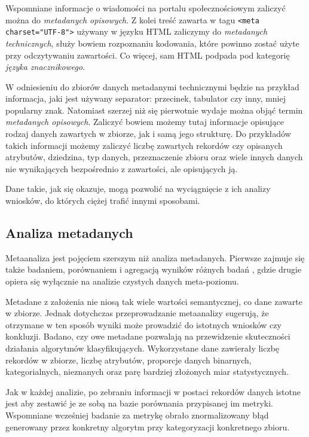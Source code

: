 	Wspomniane informacje o wiadomości na portalu społecznościowym zaliczyć można do \emph{metadanych opisowych}.
	Z kolei treść zawarta w tagu \lstinline{<meta charset="UTF-8">} używany w języku HTML zaliczymy do \emph{metadanych technicznych}, służy bowiem rozpoznaniu kodowania, które powinno zostać użyte przy odczytywaniu zawartości.
	Co więcej, sam HTML podpada pod kategorię \emph{języka znacznikowego}.

	W odniesieniu do zbiorów danych metadanymi technicznymi będzie na przykład informacja, jaki jest używany separator: przecinek, tabulator czy inny, mniej popularny znak.
	Natomiast szerzej niż się pierwotnie wydaje można objąć termin \emph{metadanych opisowych}.
	Zaliczyć bowiem możemy tutaj informacje opisujące rodzaj danych zawartych w zbiorze, jak i samą jego strukturę.
	Do przykładów takich informacji możemy zaliczyć liczbę zawartych rekordów czy opisanych atrybutów, dziedzina, typ danych, przeznaczenie zbioru oraz wiele innych danych nie wynikających bezpośrednio z zawartości, ale opisujących ją.

	Dane takie, jak się okazuje, mogą pozwolić na wyciągnięcie z ich analizy wniosków, do których ciężej trafić innymi sposobami.

	\subsection{Analiza metadanych}

	Metaanaliza jest pojęciem szerszym niż analiza metadanych.
	Pierwsze zajmuje się także badaniem, porównaniem i agregacją wyników różnych badań \cite{rosenthal2002meta}, gdzie drugie opiera się wyłącznie na analizie czystych danych meta-poziomu.

	Metadane z założenia nie niosą tak wiele wartości semantycznej, co dane zawarte w zbiorze.
	Jednak dotychczas przeprowadzanie metaanalizy sugerują, że otrzymane w ten sposób wyniki może prowadzić do istotnych wniosków czy konkluzji.
	Badano, czy owe metadane pozwalają na przewidzenie skuteczności działania algorytmów klasyfikujących.
	Wykorzystane dane zawierały liczbę rekordów w zbiorze, liczbę atrybutów, proporcje danych binarnych, kategorialnych, nieznanych oraz parę bardziej złożonych miar statystycznych.

	Jak w każdej analizie, po zebraniu informacji w postaci rekordów danych istotne jest aby zestawić je ze sobą na bazie porównania przypisanej im metryki.
	Wspomniane wcześniej badanie za metrykę obrało znormalizowany błąd generowany przez konkretny algorytm przy kategoryzacji konkretnego zbioru.
	
